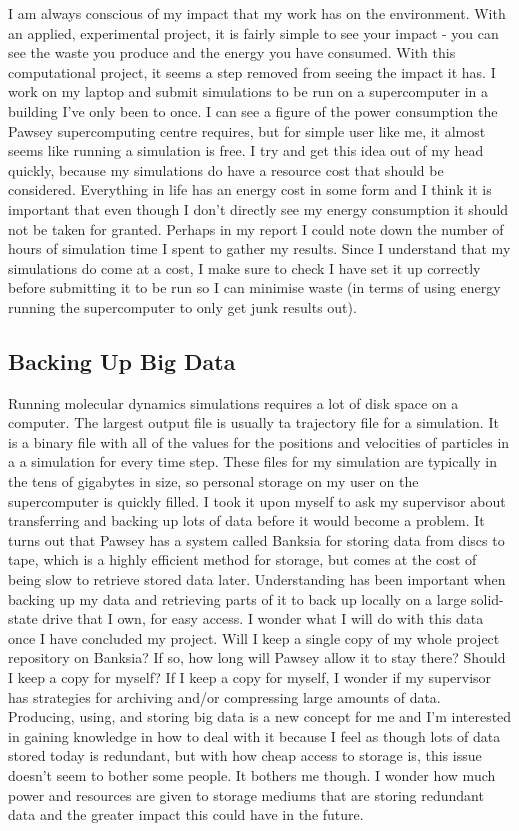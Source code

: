 \documentclass[11pt]{article}
\begin{document}
I am always conscious of my impact that my work has on the environment. With an applied, experimental project, it is fairly simple to see your impact - you can see the waste you produce and the energy you have consumed. With this computational project, it seems a step removed from seeing the impact it has. I work on my laptop and submit simulations to be run on a supercomputer in a building I've only been to once. I can see a figure of the power consumption the Pawsey supercomputing centre requires, but for simple user like me, it almost seems like running a simulation is free. I try and get this idea out of my head quickly, because my simulations do have a resource cost that should be considered. Everything in life has an energy cost in some form and I think it is important that even though I don't directly see my energy consumption it should not be taken for granted. Perhaps in my report I could note down the number of hours of simulation time I spent to gather my results. Since I understand that my simulations do come at a cost, I make sure to check I have set it up correctly before submitting it to be run so I can minimise waste (in terms of using energy running the supercomputer to only get junk results out).

\subsection{Backing Up Big Data}

Running molecular dynamics simulations requires a lot of disk space on a computer. The largest output file is usually ta trajectory file for a simulation. It is a binary file with all of the values for the positions and velocities of particles in a a simulation for every time step. These files for my simulation are typically in the tens of gigabytes in size, so personal storage on my user on the supercomputer is quickly filled. I took it upon myself to ask my supervisor about transferring and backing up lots of data before it would become a problem. It turns out that Pawsey has a system called Banksia for storing data from discs to tape, which is a highly efficient method for storage, but comes at the cost of being slow to retrieve stored data later. Understanding has been important when backing up my data and retrieving parts of it to back up locally on a large solid-state drive that I own, for easy access. I wonder what I will do with this data once I have concluded my project. Will I keep a single copy of my whole project repository on Banksia? If so, how long will Pawsey allow it to stay there? Should I keep a copy for myself? If I keep a copy for myself, I wonder if my supervisor has strategies for archiving and/or compressing large amounts of data. Producing, using, and storing big data is a new concept for me and I'm interested in gaining knowledge in how to deal with it because I feel as though lots of data stored today is redundant, but with how cheap access to storage is, this issue doesn't seem to bother some people. It bothers me though. I wonder how much power and resources are given to storage mediums that are storing redundant data and the greater impact this could have in the future.
\end{document}
